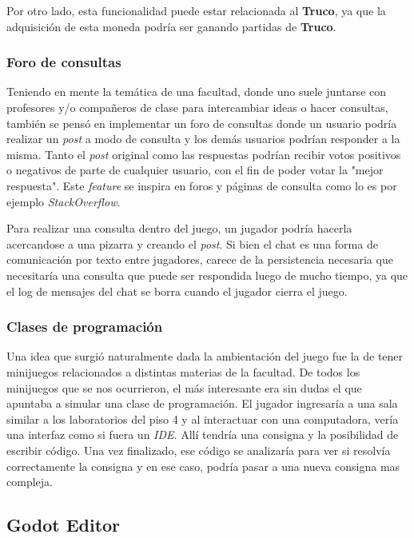 Por otro lado, esta funcionalidad puede estar relacionada al \textbf{Truco}, ya que la adquisición de esta moneda
podría ser ganando partidas de \textbf{Truco}.

\subsubsection{Foro de consultas}
Teniendo en mente la temática de una facultad, donde uno suele juntarse con profesores y/o compañeros de clase
para intercambiar ideas o hacer consultas, también se pensó en implementar un foro de consultas donde un usuario
podría realizar un \textit{post} a modo de consulta y los demás usuarios podrían responder a la misma. Tanto el \textit{post}
original como las respuestas podrían recibir votos positivos o negativos de parte de cualquier usuario, con el fin
de poder votar la "mejor respuesta". Este \textit{feature} se inspira en foros y páginas de consulta como lo es por ejemplo
\textit{StackOverflow}.

Para realizar una consulta dentro del juego, un jugador podría hacerla acercandose a una pizarra y creando el \textit{post}.
Si bien el chat es una forma de comunicación por texto entre jugadores, carece de la persistencia necesaria que necesitaría
una consulta que puede ser respondida luego de mucho tiempo, ya que el log de mensajes del chat se borra cuando el jugador
cierra el juego.

\subsubsection{Clases de programación}
Una idea que surgió naturalmente dada la ambientación del juego fue la de tener minijuegos relacionados a distintas materias
de la facultad. De todos los minijuegos que se nos ocurrieron, el más interesante era sin dudas el que apuntaba a simular
una clase de programación. El jugador ingresaría a una sala similar a los laboratorios del piso 4 y al interactuar con una
computadora, vería una interfaz como si fuera un \textit{IDE}. Allí tendría una consigna y la posibilidad de escribir código.
Una vez finalizado, ese código se analizaría para ver si resolvía correctamente la consigna y en ese caso, podría pasar a una nueva
consigna mas compleja.


\subsection{Godot Editor}

